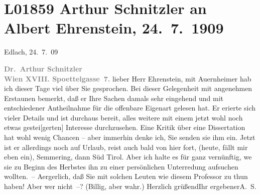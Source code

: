 

\section[Arthur Schnitzler an Albert Ehrenstein, 24. 7. 1909]{L01859 Arthur Schnitzler an Albert Ehrenstein, 24. 7. 1909}
\nopagebreak{}
\rehead{ }\normalsize\beginnumbering{}
\toendnotes[C]{\smallbreak\pagebreak[2]}
\toendnotes[C]{\smallbreak}
\pstart
           \raggedleft{}{\pb}Edlach, 24. 7. 09\pend
           
\pstart
           \textcolor{gray}{\textbf{Dr. Arthur Schnitzler}}{\\}\textcolor{gray}{\textbf{Wien XVIII. Spoettelgasse 7.}}\pend
           \vspace{0.5em}
\pstart
           lieber Herr Ehrenstein, mit Auernheimer hab ich dieser Tage viel über Sie gesprochen. Bei dieser
               Gelegenheit mit angenehmen Erstaunen bemerkt, daß er Ihre Sachen damals sehr
               eingehend und mit entschiedener Antheilnahme für die offenbare Eigenart gelesen hat.
               Er eri{\geminationn}erte sich vieler Details und ist durchaus bereit,
               alles weitere mit einem jetzt wohl noch etwas gestei{\pb}{[}gerten{]} Interesse durchzusehen. Eine Kritik über eine Dissertation hat wohl wenig
               Chancen – aber immerhin denke ich, Sie senden sie ihm ein. Jetzt ist er allerdings
               noch auf Urlaub, reist auch bald von hier fort, (heute, fällt mir eben ein), Semmering, dann Süd
                  Tirol. Aber ich halte es für ganz vernünftig, we{\geminationn} sie zu Beginn des Herbstes ihn zu einer persönlichen Unterredung aufsuchen
               wollten. – Aergerlich, daß Sie mit solchen Leuten wie diesem Professor zu thun haben! Aber wer nicht –?
               (Billig, aber wahr.) Herzlich grüßend\hspace*{1.5em}Ihr
                  ergebener\spacefill\mbox{A. S.}\pend
           \endnumbering{}  
      